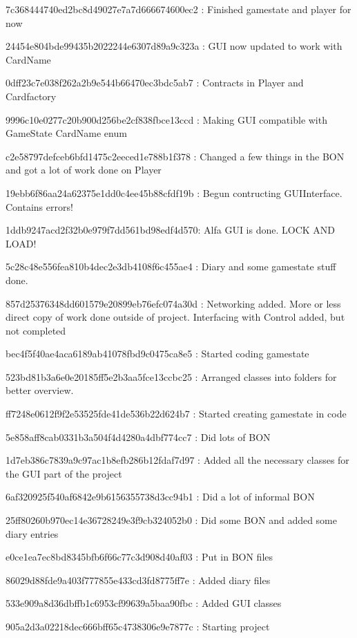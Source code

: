 7c368444740ed2bc8d49027e7a7d666674600ec2 : Finished gamestate and player for now

24454e804bde99435b2022244e6307d89a9c323a : GUI now updated to work with CardName

0dff23c7e038f262a2b9e544b66470ec3bdc5ab7 : Contracts in Player and Cardfactory

9996c10e0277c20b900d256be2cf838fbce13ccd : Making GUI compatible with GameState CardName enum

c2e58797defceb6bfd1475c2eeced1e788b1f378 : Changed a few things in the BON and got a lot of work done on Player

19ebb6f86aa24a62375e1dd0c4ee45b88cfdf19b : Begun contructing GUIInterface. Contains errors!

1ddb9247acd2f32b0e979f7dd561bd98edf4d570: Alfa GUI is done. LOCK AND LOAD!

5c28c48e556fea810b4dec2e3db4108f6c455ae4 : Diary and some gamestate stuff done.

857d25376348dd601579e20899eb76efc074a30d : Networking added. More or less direct copy of work done outside of project. Interfacing with Control added, but not completed

bec4f5f40ae4aca6189ab41078fbd9c0475ca8e5 : Started coding gamestate

523bd81b3a6e0e20185ff5e2b3aa5fce13ccbc25 : Arranged classes into folders for better overview.

ff7248e0612f9f2e53525fde41de536b22d624b7 : Started creating gamestate in code

5e858aff8cab0331b3a504f4d4280a4dbf774cc7 : Did lots of BON

1d7eb386c7839a9c97ac1b8efb286b12fdaf7d97 : Added all the necessary classes for the GUI part of the project

6af320925f540af6842e9b6156355738d3cc94b1 : Did a lot of informal BON

25ff80260b970ec14e36728249e3f9cb324052b0 : Did some BON and added some diary entries

e0ce1ea7ec8bd8345bfb6f66c77c3d908d40af03 : Put in BON files

86029d88fde9a403f777855e433cd3fd8775ff7e : Added diary files

533e909a8d36dbffb1c6953cf99639a5baa90fbc  : Added GUI classes 

905a2d3a02218dec666bff65c4738306e9e7877c : Starting project 